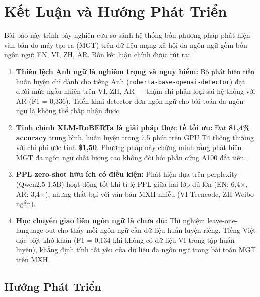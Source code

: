 
\section{Kết Luận và Hướng Phát Triển}
\label{sec:conclusion}

Bài báo này trình bày nghiên cứu so sánh hệ thống bốn phương pháp phát
hiện văn bản do máy tạo ra (MGT) trên dữ liệu mạng xã hội đa ngôn ngữ
gồm bốn ngôn ngữ: EN, VI, ZH, AR. Bốn kết luận chính được rút ra:

\begin{enumerate}
    \item \textbf{Thiên lệch Anh ngữ là nghiêm trọng và nguy hiểm:}
    Bộ phát hiện tiền huấn luyện chỉ dành cho tiếng Anh (\texttt{roberta-base-openai-detector})
    đạt dưới mức ngẫu nhiên trên VI, ZH, AR --- thậm chí phân loại sai
    hệ thống với AR (F1 = 0,336). Triển khai detector đơn ngôn ngữ cho
    bài toán đa ngôn ngữ là không thể chấp nhận được.

    \item \textbf{Tinh chỉnh XLM-RoBERTa là giải pháp thực tế tối ưu:}
    Đạt \textbf{81,4\% accuracy} trung bình, huấn luyện trong 7,5
    phút trên GPU T4 thông thường với chi phí ước tính \textbf{\$1,50}.
    Phương pháp này chứng minh rằng phát hiện MGT đa ngôn ngữ chất lượng
    cao không đòi hỏi phần cứng A100 đắt tiền.

    \item \textbf{PPL zero-shot hữu ích có điều kiện:}
    Phát hiện dựa trên perplexity (Qwen2.5-1.5B) hoạt động tốt khi tỉ
    lệ PPL giữa hai lớp đủ lớn (EN: 6,4$\times$, AR: 3,4$\times$), nhưng
    thất bại với văn bản MXH nhiễu (VI Teencode, ZH Weibo ngắn).

    \item \textbf{Học chuyển giao liên ngôn ngữ là chưa đủ:}
    Thí nghiệm leave-one-language-out cho thấy mỗi ngôn ngữ cần dữ liệu
    huấn luyện riêng. Tiếng Việt đặc biệt khó khăn (F1 = 0,134 khi
    không có dữ liệu VI trong tập huấn luyện), khẳng định tính tất yếu
    của dữ liệu đa ngôn ngữ trong bài toán MGT trên MXH.
\end{enumerate}

\subsection*{Hướng Phát Triển}

